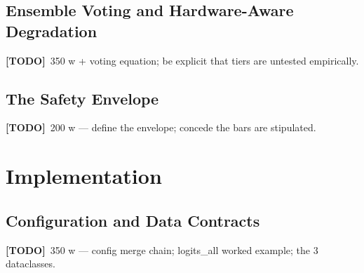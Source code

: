 \documentclass[11pt,a4paper]{report}
\newcommand{\todo}[1]{\par\noindent\textcolor{red!70!black}{\small\textbf{[TODO]}~#1}\par}
\begin{document}
\section{Ensemble Voting and Hardware-Aware Degradation}
\label{sec:method-ensemble}
\todo{350 w + voting equation; be explicit that tiers are untested empirically.}

\section{The Safety Envelope}
\label{sec:method-envelope}
\todo{200 w — define the envelope; concede the bars are stipulated.}

\chapter{Implementation}
\label{ch:impl}

\section{Configuration and Data Contracts}
\label{sec:impl-config}
\todo{350 w — config merge chain; logits_all worked example; the 3 dataclasses.}
\end{document}

